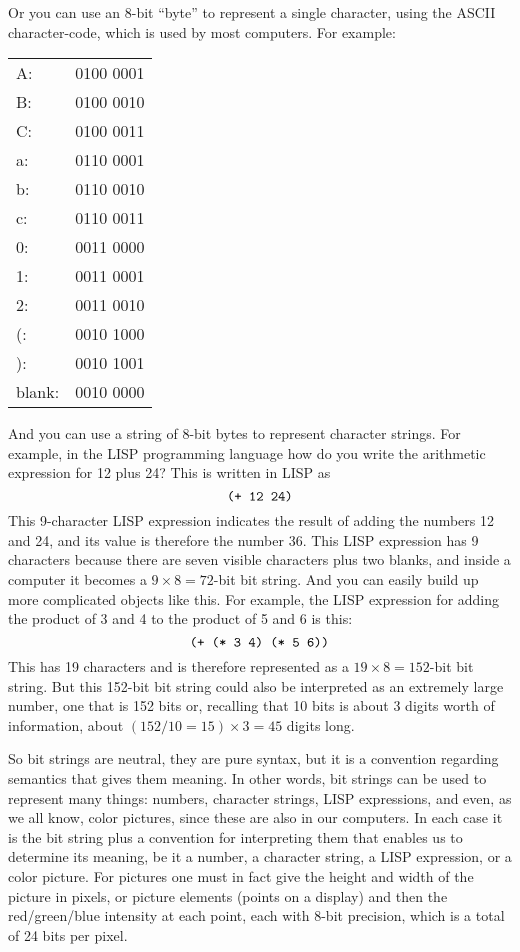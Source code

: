 \documentclass[12pt]{book}
\begin{document}
Or you can use an 8-bit ``byte'' to represent a single character, using the ASCII character-code,
which is used by most computers.
For example:
\begin{center}
\begin{tabular}{lr}
A: & 0100 0001 \\
B: & 0100 0010 \\
C: & 0100 0011 \\
a: & 0110 0001 \\
b: & 0110 0010 \\
c: & 0110 0011 \\
0: & 0011 0000 \\
1: & 0011 0001 \\
2: & 0011 0010 \\
(: & 0010 1000 \\
): & 0010 1001 \\
blank: & 0010 0000
\end{tabular}
\end{center}
 
And you can use a string of 8-bit bytes to represent character strings.
For example, in the LISP programming language 
how do you write the arithmetic expression for 12 plus 24?
This is written in LISP as
\[\mbox{\texttt{
  (+ 12 24) 
}}\]
This 9-character LISP expression
indicates the result of adding the numbers 12 and 24, and its
value is therefore the number 36. 
This LISP expression has 9 characters because there are seven visible characters plus two blanks, 
and inside a computer it becomes
a $9 \times 8 = 72$-bit bit string.
And you can easily build up more complicated objects like this.
For example, the LISP expression for adding the product of 3 and 4 to the product of 5 and 6 is this:
\[\mbox{\texttt{
  (+ (* 3 4) (* 5 6))
}}\]
This has 19 characters and is therefore represented as a $19 \times 8 = 152$-bit bit string.
But this 152-bit bit string could also be interpreted as an extremely large number, one that is
152 bits or, recalling that 10 bits is about 3 digits worth of information, about
$(152/10 = 15) \times 3 = 45$ digits long.
 
So bit strings are neutral, they are pure syntax, but it is a convention regarding semantics
that gives them meaning. 
In other words, bit strings can be used to represent many things: numbers,
character strings, LISP expressions, and even, as we all know, color pictures, since these
are also in our computers.  In each case it is the bit string plus a convention for interpreting
them that enables us to determine its meaning, be it a number, a character string, a LISP expression,
or a color picture.  For pictures one must in fact give the height and width of the picture in pixels,
or picture elements (points on a display) and then the red/green/blue intensity at each point, each
with 8-bit precision, which is a total of 24 bits per pixel.
\end{document}
